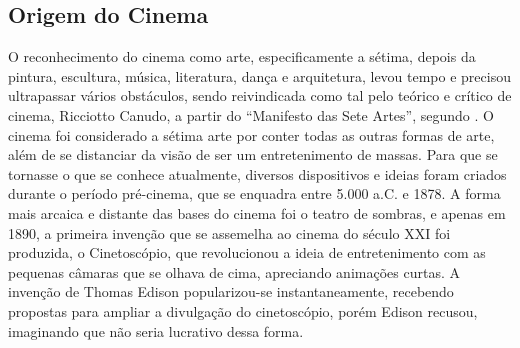 \documentclass[
	article,			%
	12pt,				%
	oneside,			%
	a4paper,			%
	english,			%
	brazil,				%
	sumario=tradicional
	]{abntex2}
\begin{document}
\begin{comment}

Especial atenção ao que este capítulo deve conter:
    \begin{citacao}
    "Revisão bibliográfica, conforme já comentado, não produz conhecimento novo, mas apenas supre as
    deficiências de conhecimento que o pesquisador tem em uma determinada área. Portanto, ela deve ser muito
    bem planejada e conduzida.
    (...)
    Quando se faz uma pesquisa em que alguma técnica de computação é aplicada a alguma outra área do
    conhecimento, é necessário que se faça a revisão bibliográfica sobre a técnica em si, sobre a área de aplicação e,
    mais do que tudo, sobre as aplicações que já foram tentadas com essa técnica ou com técnicas semelhantes na
    mesma área ou em áreas equivalentes. Exemplificando, um aluno pretende desenvolver um sistema
    multiagentes para auxiliar controladores de voo. Esse aluno deve conhecer profundamente os sistemas
    multiagentes e deverá conhecer também os problemas que os controladores de voo enfrentam para exercer sua
    profissão. Porém, ele não deve pensar, como algumas vezes acontece, que essa é a primeira vez que alguém vai
    tentar desenvolver um sistema multiagentes para esse tipo de aplicação."
    \cite{PESQUISA:RAUL}.
    \end{citacao}

Toda a revisão da literatura deve ser basear primordialmente em livros e artigos científicos ranqueados Qualis CAPES. De forma geral, todo parágrafo deve conter AO MENOS uma citação bibliográfica.

\end{comment}

\subsection{Origem do Cinema}

O reconhecimento do cinema como arte, especificamente a sétima, depois da pintura, escultura, música, literatura, dança e arquitetura, levou tempo e precisou ultrapassar vários obstáculos, sendo reivindicada como tal pelo teórico e crítico de cinema, Ricciotto Canudo, a partir do “Manifesto das Sete Artes”, segundo . O cinema foi considerado a sétima arte por conter todas as outras formas de arte, além de se distanciar da visão de ser um entretenimento de massas. Para que se tornasse o que se conhece atualmente, diversos dispositivos e ideias foram criados durante o período pré-cinema, que se enquadra entre 5.000 a.C. e 1878. A forma mais arcaica e distante das bases do cinema foi o teatro de sombras, e apenas em 1890, a primeira invenção que se assemelha ao cinema do século XXI foi produzida, o Cinetoscópio, que revolucionou a ideia de entretenimento com as pequenas câmaras que se olhava de cima, apreciando animações curtas. A invenção de Thomas Edison popularizou-se instantaneamente, recebendo propostas para ampliar a divulgação do cinetoscópio, porém Edison recusou, imaginando que não seria lucrativo dessa forma.
\end{document}
